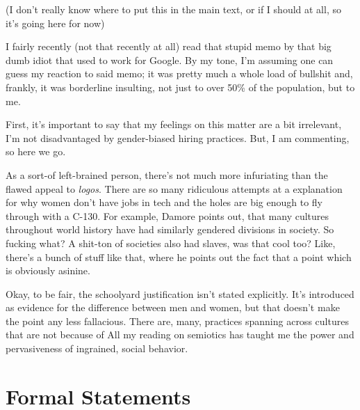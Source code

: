\documentclass[../butidigress.tex]{subfiles}
\begin{document}
(I don't really know where to put this in the main text, or if I should at all, so it's going here for now)

I fairly recently (not that recently at all) read that stupid memo by that big dumb idiot that used to work for Google.
By my tone, I'm assuming one can guess my reaction to said memo; it was pretty much a whole load of bullshit and, frankly, it was borderline insulting, not just to over 50\% of the population, but to me.

First, it's important to say that my feelings on this matter are a bit irrelevant, I'm not disadvantaged by gender-biased hiring practices.
But, I am commenting, so here we go.

As a sort-of left-brained person, there's not much more infuriating than the flawed appeal to \textit{logos}.
There are so many ridiculous attempts at a  explanation for why women don't have jobs in tech and the holes are big enough to fly through with a C-130.
For example, Damore points out, that many cultures throughout world history have had similarly gendered divisions in society.
So fucking what?
A shit-ton of societies also had slaves, was that cool too?
Like, there's a bunch of stuff like that, where he points out the fact that  a point which is obviously asinine.

Okay, to be fair, the schoolyard justification isn't stated explicitly.
It's introduced as evidence for the  difference between men and women, but that doesn't make the point any less fallacious.
There are, many, practices spanning across cultures that are not because of 
All my reading on semiotics has taught me the power and pervasiveness of ingrained, social behavior.

\section{Formal Statements}
\end{document}
